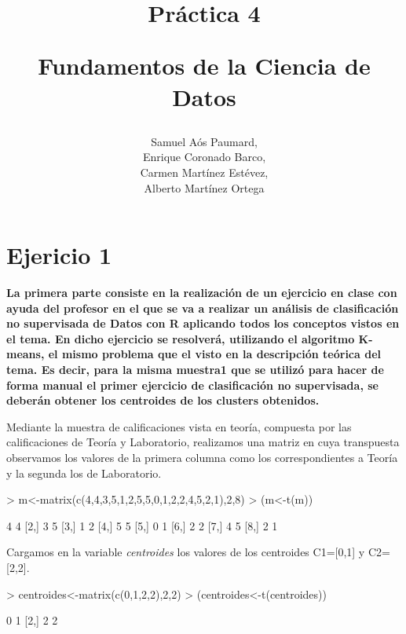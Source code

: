 \documentclass[a4paper]{article}
\title{ Práctica 4 \\
\begin{large}
     Fundamentos de la Ciencia de Datos
\end{large}
}
\author{Samuel Aós Paumard,\\
Enrique Coronado Barco,\\
Carmen Martínez Estévez,\\
Alberto Martínez Ortega}
\begin{document}

\maketitle

\section{Ejericio 1}
\textbf{La primera parte consiste en la realización de un ejercicio en clase con ayuda del profesor en el que se va a realizar un análisis de clasificación no supervisada de Datos con R aplicando todos los conceptos vistos en el tema. En dicho ejercicio se resolverá, utilizando el algoritmo K-means, el mismo problema que el visto en la descripción teórica del tema. Es decir, para la misma muestra1 que se utilizó para hacer de forma manual el primer ejercicio de clasificación no supervisada, se deberán obtener los centroides de los clusters obtenidos.}

Mediante la muestra de calificaciones vista en teoría, compuesta por las calificaciones de Teoría y Laboratorio, realizamos una matriz en cuya transpuesta observamos los valores de la primera columna como los correspondientes a Teoría y la segunda los de Laboratorio.

\begin{Schunk}
\begin{Sinput}
> m<-matrix(c(4,4,3,5,1,2,5,5,0,1,2,2,4,5,2,1),2,8)
> (m<-t(m))
\end{Sinput}
\begin{Soutput}
     [,1] [,2]
[1,]    4    4
[2,]    3    5
[3,]    1    2
[4,]    5    5
[5,]    0    1
[6,]    2    2
[7,]    4    5
[8,]    2    1
\end{Soutput}
\end{Schunk}

Cargamos en la variable \textit{centroides} los valores de los centroides C1=[0,1] y C2=[2,2].
\begin{Schunk}
\begin{Sinput}
> centroides<-matrix(c(0,1,2,2),2,2)
> (centroides<-t(centroides))
\end{Sinput}
\begin{Soutput}
     [,1] [,2]
[1,]    0    1
[2,]    2    2
\end{Soutput}
\end{Schunk}
\end{document}
